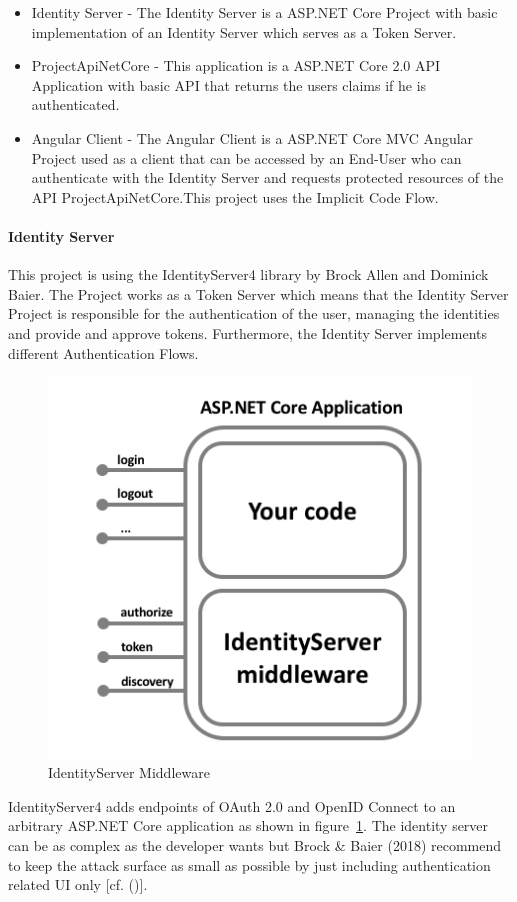 \begin{itemize}
	\item Identity Server - The Identity Server is a ASP.NET Core Project with basic implementation of an Identity Server which serves as a Token Server. 
	\item ProjectApiNetCore - This application is a ASP.NET Core 2.0 API Application with basic API that returns the users claims if he is authenticated.
	\item Angular Client - The Angular Client is a ASP.NET Core MVC Angular Project used as a client that can be accessed by an End-User who can authenticate with the Identity Server and requests protected resources of the API ProjectApiNetCore.This project uses the Implicit Code Flow. 
\end{itemize}



\paragraph{Identity Server}

This project is using the IdentityServer4 library by Brock Allen and Dominick Baier. The Project works as a Token Server which means that the Identity Server Project is responsible for the authentication of the user, managing the identities and provide and approve tokens. Furthermore, the Identity Server implements different Authentication Flows.


\begin{figure}[h]
	\centering
	\includegraphics[width=0.6\linewidth]{images/middlewareIdentityServer}
	\caption{IdentityServer Middleware}
	\label{fig:middlewareidentityserver}
\end{figure}
 

IdentityServer4 adds endpoints of OAuth 2.0 and OpenID Connect to an arbitrary ASP.NET Core application as shown in figure~\ref{fig:middlewareidentityserver}. The identity server can be as complex as the developer wants but Brock \& Baier (2018) recommend to keep the attack surface as small as possible by just including authentication related UI only [cf. (\cite{Brock:2018:ID4})]. 


